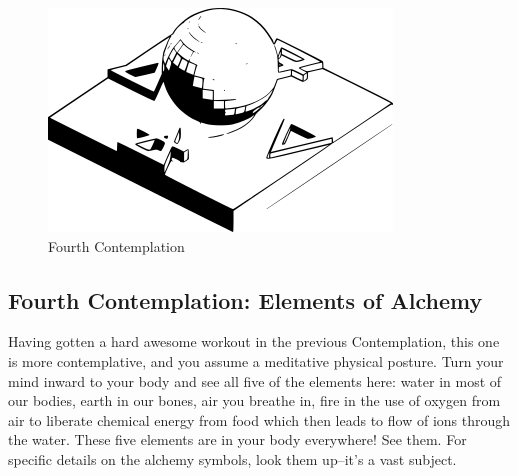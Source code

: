 \begin{figure}[htbp]
\centering
\includegraphics{images/contemplations/contemplation4C.png}
\caption{Fourth Contemplation}
\end{figure}

\subsection{Fourth Contemplation: Elements of
Alchemy}\label{fourth-contemplation-elements-of-alchemy}

Having gotten a hard awesome workout in the previous Contemplation, this
one is more contemplative, and you assume a meditative physical posture.
Turn your mind inward to your body and see all five of the elements
here: water in most of our bodies, earth in our bones, air you breathe
in, fire in the use of oxygen from air to liberate chemical energy from
food which then leads to flow of ions through the water. These five
elements are in your body everywhere! See them. For specific details on
the alchemy symbols, look them up--it's a vast subject.
